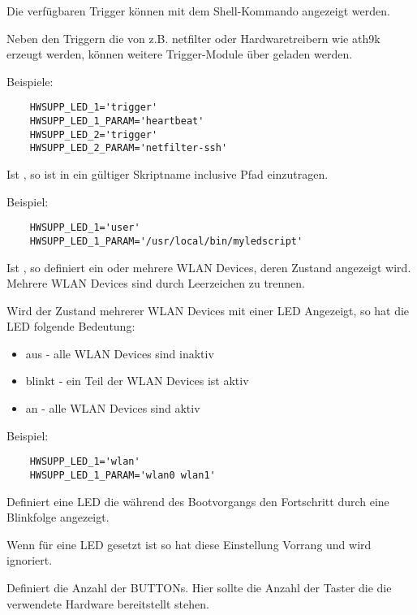 \begin{description}
  Die verfügbaren Trigger können mit dem Shell-Kommando 
   angezeigt werden.
  
  Neben den Triggern die von z.B. netfilter oder Hardwaretreibern wie ath9k
  erzeugt werden, können weitere Trigger-Module über 
  geladen werden.
  
  Beispiele:
  \begin{verbatim}
    HWSUPP_LED_1='trigger'
    HWSUPP_LED_1_PARAM='heartbeat'
    HWSUPP_LED_2='trigger'
    HWSUPP_LED_2_PARAM='netfilter-ssh'
  \end{verbatim}

  Ist , so ist in  ein 
  gültiger Skriptname inclusive Pfad einzutragen.

  Beispiel:
  \begin{verbatim}
    HWSUPP_LED_1='user'
    HWSUPP_LED_1_PARAM='/usr/local/bin/myledscript'
  \end{verbatim}

  Ist , so definiert  ein
  oder mehrere WLAN Devices, deren Zustand angezeigt wird.
  Mehrere WLAN Devices sind durch Leerzeichen zu trennen.

  Wird der Zustand mehrerer WLAN Devices mit einer LED Angezeigt, so hat die 
  LED folgende Bedeutung:
  \begin{itemize}
    \item aus - alle WLAN Devices sind inaktiv
    \item blinkt - ein Teil der WLAN Devices ist aktiv
    \item an - alle WLAN Devices sind aktiv
  \end{itemize} 
  
  Beispiel:
  \begin{verbatim}
    HWSUPP_LED_1='wlan'
    HWSUPP_LED_1_PARAM='wlan0 wlan1'
  \end{verbatim}

  Definiert eine LED die während des Bootvorgangs den Fortschritt durch
  eine Blinkfolge angezeigt. 

  Wenn für eine LED  gesetzt ist so hat diese
  Einstellung Vorrang und  wird ignoriert.

  Definiert die Anzahl der BUTTONs. Hier sollte die Anzahl der 
  Taster die die verwendete Hardware bereitstellt stehen.


\end{description}
